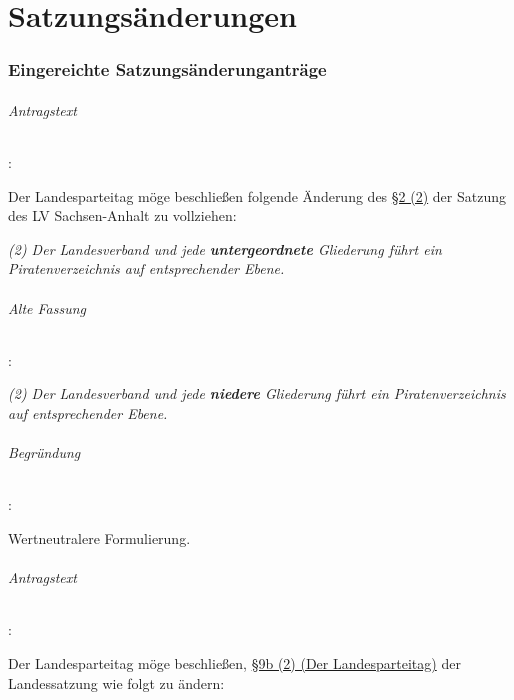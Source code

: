\part{Satzungsänderungen}
\section{Eingereichte Satzungsänderunganträge}

\paragraph{Antragstext}:

Der Landesparteitag möge beschließen folgende Änderung des \href{http://wiki.piratenpartei.de/LSA:Satzung#.C2.A7_2_-_Mitgliedschaft}{§2 (2)} der Satzung des LV Sachsen-Anhalt zu vollziehen:

\textit{(2) Der Landesverband und jede \textbf{untergeordnete} Gliederung führt ein Piratenverzeichnis auf entsprechender Ebene.}

\paragraph{Alte Fassung}:

\textit{(2) Der Landesverband und jede \textbf{niedere} Gliederung führt ein Piratenverzeichnis auf entsprechender Ebene.}

\paragraph{Begründung}:

Wertneutralere Formulierung. 



\paragraph{Antragstext}:

Der Landesparteitag möge beschließen, \href{http://wiki.piratenpartei.de/LSA:Satzung#.C2.A7_9b_-_Der_Landesparteitag}{§9b (2) (Der Landesparteitag)} der Landessatzung wie folgt zu ändern:

